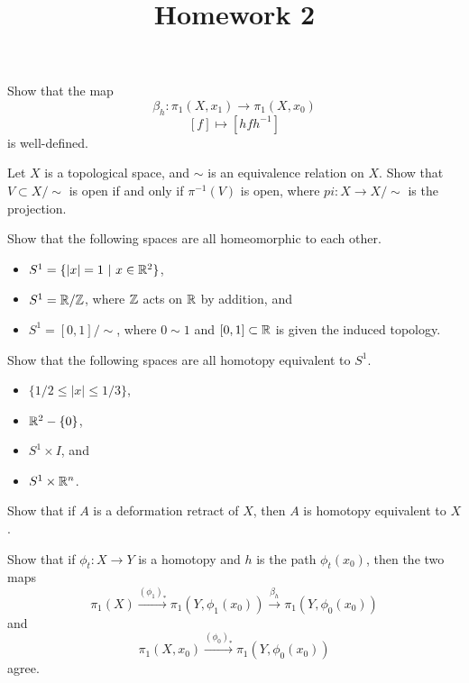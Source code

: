 \documentclass[12pt]{amsart}
\begin{document}
\title{Homework 2}


\maketitle
\begin{problem}
Show that the map $$\beta_h: \pi_1(X, x_1) \to \pi_1(X, x_0)$$
$$[f] \mapsto [hfh^{-1}]$$
is well-defined.
\end{problem}


\begin{problem}
Let $X$ is a topological space, and $\sim$ is an equivalence relation on $X$. Show that $V\subset X/\sim$ is open if and only if $\pi^{-1}(V)$ is open, where $pi: X \to X/\sim$ is the projection.
\end{problem}


\begin{problem}
Show that the following spaces are all homeomorphic to each other.
\begin{itemize}
    \item $S^1 = \{ |x|=1 ~|~ x \in \mathbb{R}^2\}$,
    \item $S^1 = \mathbb{R}/\mathbb{Z}$, where $\mathbb{Z}$ acts on $\mathbb{R}$ by addition, and 
    \item $S^1 = [0,1]/\sim$, where $0 \sim 1$ and $[0,1]\subset \mathbb{R}$ is given the induced topology.
\end{itemize}
\end{problem}

\begin{problem}
Show that the following spaces are all homotopy equivalent to $S^1$.
\begin{itemize}
    \item $\{ 1/2 \leq |x| \leq 1/3\}$,
    \item $\mathbb{R}^2 -\{0\}$,
    \item $ S^1 \times I$, and
    \item $S^1 \times \mathbb{R}^n$.
\end{itemize}
\end{problem}

\begin{problem}
Show that if $A$ is a deformation retract of $X$, then $A$ is homotopy equivalent to $X$.
\end{problem}

\begin{problem}
Show that if $\phi_t: X\to Y$ is a homotopy and $h$ is the path $\phi_t(x_0)$, then the two maps $$\pi_1(X) \xrightarrow{(\phi_1)_*} \pi_1(Y, \phi_1(x_0)) \xrightarrow{\beta_h} \pi_1(Y, \phi_0(x_0))$$ and 
$$\pi_1(X,x_0)\xrightarrow{(\phi_0)_*} \pi_1(Y, \phi_0(x_0))$$
agree.
\end{problem}
\end{document}
